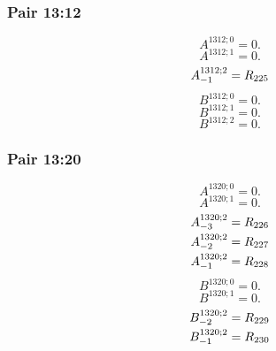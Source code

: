 \documentclass[11pt,a4paper]{article}
\begin{document}
\subsubsection{Pair 13:12}
\begin{equation}
A^{1312;0}=0.
\label{eq:cat-map-354}
\end{equation}
\begin{equation}
A^{1312;1}=0.
\label{eq:cat-map-355}
\end{equation}
\begin{equation}
\shortstack[l]{$\displaystyle A^{1312;2}_{-1}=R_{225}$}
\label{eq:cat-map-356}
\end{equation}
\begin{equation}
B^{1312;0}=0.
\label{eq:cat-map-357}
\end{equation}
\begin{equation}
B^{1312;1}=0.
\label{eq:cat-map-358}
\end{equation}
\begin{equation}
B^{1312;2}=0.
\label{eq:cat-map-359}
\end{equation}
\subsubsection{Pair 13:20}
\begin{equation}
A^{1320;0}=0.
\label{eq:cat-map-360}
\end{equation}
\begin{equation}
A^{1320;1}=0.
\label{eq:cat-map-361}
\end{equation}
\begin{equation}
\shortstack[l]{$\displaystyle A^{1320;2}_{-3}=R_{226}$\\
$\displaystyle A^{1320;2}_{-2}=R_{227}$\\
$\displaystyle A^{1320;2}_{-1}=R_{228}$}
\label{eq:cat-map-362}
\end{equation}
\begin{equation}
B^{1320;0}=0.
\label{eq:cat-map-363}
\end{equation}
\begin{equation}
B^{1320;1}=0.
\label{eq:cat-map-364}
\end{equation}
\begin{equation}
\shortstack[l]{$\displaystyle B^{1320;2}_{-2}=R_{229}$\\
$\displaystyle B^{1320;2}_{-1}=R_{230}$}
\label{eq:cat-map-365}
\end{equation}
\end{document}
